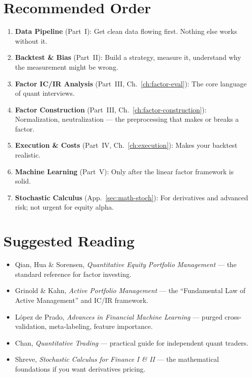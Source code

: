 \documentclass[a4paper, 11pt]{report}
\theoremstyle{definition}
\theoremstyle{remark}
\begin{document}
\section{Recommended Order}

\begin{enumerate}
    \item \textbf{Data Pipeline} (Part~I): Get clean data flowing first.
          Nothing else works without it.
    \item \textbf{Backtest \& Bias} (Part~II): Build a strategy, measure it,
          understand why the measurement might be wrong.
    \item \textbf{Factor IC/IR Analysis} (Part~III, Ch.~\ref{ch:factor-eval}):
          The core language of quant interviews.
    \item \textbf{Factor Construction} (Part~III, Ch.~\ref{ch:factor-construction}):
          Normalization, neutralization --- the preprocessing that makes or
          breaks a factor.
    \item \textbf{Execution \& Costs} (Part~IV, Ch.~\ref{ch:execution}):
          Makes your backtest realistic.
    \item \textbf{Machine Learning} (Part~V): Only after the linear factor
          framework is solid.
    \item \textbf{Stochastic Calculus} (App.~\ref{sec:math-stoch}): For
          derivatives and advanced risk; not urgent for equity alpha.
\end{enumerate}

\section{Suggested Reading}

\begin{itemize}
    \item Qian, Hua \& Sorensen, \textit{Quantitative Equity Portfolio
          Management} --- the standard reference for factor investing.
    \item Grinold \& Kahn, \textit{Active Portfolio Management} --- the
          ``Fundamental Law of Active Management'' and IC/IR framework.
    \item L\'{o}pez de Prado, \textit{Advances in Financial Machine Learning}
          --- purged cross-validation, meta-labeling, feature importance.
    \item Chan, \textit{Quantitative Trading} --- practical guide for
          independent quant traders.
    \item Shreve, \textit{Stochastic Calculus for Finance I \& II} --- the
          mathematical foundations if you want derivatives pricing.
\end{itemize}
\end{document}
